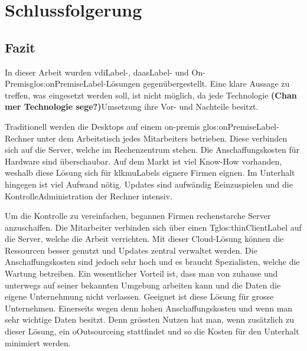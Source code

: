 \chapter{Schlussfolgerung}




\section{Fazit}
In dieser Arbeit wurden \Gls{vdiLabel}-, \Gls{daasLabel}- und On-Premis\gls{glos:onPremiseLabel}-Lösungen gegenübergestellt. Eine klare Aussage zu treffen, was eingesetzt werden soll, ist nicht möglich, da jede Technologie \textbf{(Chan mer Technologie sege?)}Umsetzung ihre Vor- und Nachteile besitzt.

Traditionell werden die Desktops auf einem on-premis \gls{glos:onPremiseLabel}-Rechner unter dem Arbeitstisch jedes Mitarbeiters betrieben. Diese verbinden sich auf die Server, welche im Rechenzentrum stehen. Die Anschaffungskosten für Hardware sind überschaubar. Auf dem Markt ist viel Know-How vorhanden, weshalb diese Lösung sich für kl\Glspl{kmuLabel} eignere Firmen eignen. Im Unterhalt hingegen ist viel Aufwand nötig. Updates sind aufwändig Eeinzuspielen und die KontrolleAdministration der Rechner intensiv.

Um die Kontrolle zu vereinfachen, begannen Firmen rechenstarche Server anzuschaffen. Die Mitarbeiter verbinden sich über einen T\Gls{glos:thinClientLabel} auf die Server, welche die Arbeit verrichten. Mit dieser Cloud-Lösung können die Ressourcen besser genutzt und Updates zentral verwaltet werden. Die Anschaffungskosten sind jedoch sehr hoch und es braucht Spezialisten, welche die Wartung betreiben. Ein wesentlicher Vorteil ist, dass man von zuhause und unterwegs auf seiner bekannten Umgebung arbeiten kann und die Daten die eigene Unternehmung nicht verlassen. Geeignet ist diese Lösung für grosse Unternehmen. Einerseits wegen denn hohen Anschaffungskosten und wenn man sehr wichtige Daten besitzt. Denn grössten Nutzen hat man, wenn zusätzlich zu dieser Lösung, ein oOutsourceing stattfindet und so die Kosten für den Unterhalt minimiert werden. 

